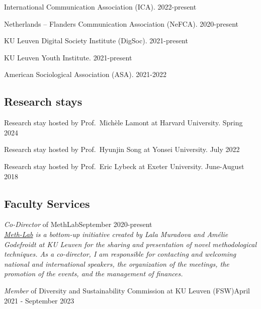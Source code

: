 \documentclass[12pt,]{article}
\begin{document}
International Communication Association (ICA).
\hfill \begingroup\small 2022-present\endgroup

Netherlands -- Flanders Communication Association (NeFCA).
\hfill \begingroup\small 2020-present\endgroup

KU Leuven Digital Society Institute (DigSoc).
\hfill \begingroup\small 2021-present\endgroup

KU Leuven Youth Institute.
\hfill \begingroup\small 2021-present\endgroup

American Sociological Association (ASA).
\hfill \begingroup\small 2021-2022\endgroup

\hypertarget{research-stays}{%
\subsection{Research stays}\label{research-stays}}

Research stay hosted by Prof.~Michèle Lamont at Harvard University.
\hfill \begingroup\small Spring 2024\endgroup

Research stay hosted by Prof.~Hyunjin Song at Yonsei University.
\hfill \begingroup\small July 2022\endgroup

Research stay hosted by Prof.~Eric Lybeck at Exeter University.
\hfill \begingroup\small June-August 2018\endgroup

\hypertarget{faculty-services}{%
\subsection{Faculty Services}\label{faculty-services}}

\emph{Co-Director} of MethLab\hfill \begingroup\small September
2020-present\endgroup\\
\emph{\href{https://soc.kuleuven.be/fsw/doctoralprogramme/meth-lab}{Meth-Lab}
is a bottom-up initiative created by Lala Muradova and Amélie Godefroidt
at KU Leuven for the sharing and presentation of novel methodological
techniques. As a co-director, I am responsible for contacting and
welcoming national and international speakers, the organization of the
meetings, the promotion of the events, and the management of finances.}

\emph{Member} of Diversity and Sustainability Commission at KU Leuven
(FSW)\hfill \begingroup\small April 2021 - September 2023\endgroup\\
\end{document}

